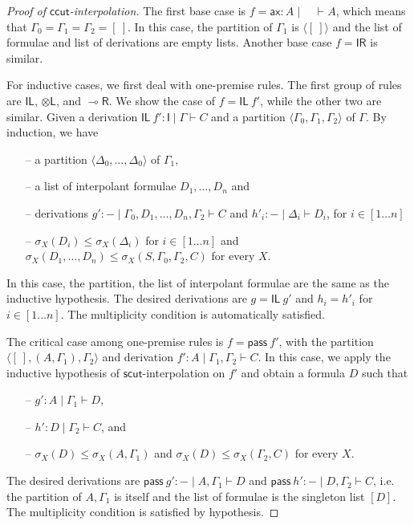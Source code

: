 \documentclass[sn-mathphys-num]{sn-jnl}%
\newcommand{\GG}{\Gamma}
\newcommand{\GD}{\Delta}
\newcommand{\vd}{\vdash}
\newcommand{\tl}{\otimes \mathsf{L}}
\newcommand{\pass}{\mathsf{pass}}
\newcommand{\unitl}{\mathsf{IL}}
\newcommand{\unitr}{\mathsf{IR}}
\newcommand{\ax}{\mathsf{ax}}
\newcommand{\lolli}{\multimap}
\newcommand{\lright}{{\lolli}\mathsf{R}}
\newcommand{\unit}{\mathsf{I}}
\newcommand{\mf}[1]{\mathsf{#1}}
\newcommand{\gs}[1]{\sigma_{X} (#1)}
\theoremstyle{thmstyleone}%
\theoremstyle{thmstyletwo}%
\theoremstyle{thmstylethree}%
\begin{document}
\begin{proof}[Proof of $\mf{ccut}$-interpolation]
The first base case is $f  = \ax : A \mid \quad \vd A$, which means that $\GG_0 = \GG_1 = \GG_2 = [\ ]$.
In this case, the partition of $\GG_1$ is $\langle [\ ] \rangle$ and the list of formulae and list of derivations are empty lists.
Another base case $f = \unitr$ is similar.

For inductive cases, we first deal with one-premise rules. 
The first group of rules are $\unitl$, $\tl$, and $\lright$. 
We show the case of $f = \unitl \ f'$, while the other two are similar.
Given a derivation $\unitl \ f' : \unit \mid \GG \vd C$ and a partition $\langle \GG_0 , \GG_1 , \GG_2\rangle$ of $\GG$.
By induction, we have 
\begin{itemize}
  \item[--] a partition $\langle \GD_0, \dots , \GD_0 \rangle$ of $\GG_1$, 
  \item[--] a list of interpolant formulae $D_1, \dots , D_n$ and
  \item[--] derivations $g' : {-} \mid \GG_0 , D_1 , \dots , D_n , \GG_2 \vd C$ and $h'_i : {-} \mid \GD_i \vd D_i$, for $i \in [1 \dots n]$
  \item[--]  $\gs{D_i} \leq \gs{\GD_i}$ for $i \in [1 \dots n]$ and $\gs{D_1, \dots, D_n} \leq \gs{S, \GG_0, \GG_2, C}$ for every $X$.
\end{itemize}
In this case, the partition, the list of interpolant formulae are the same as the inductive hypothesis.
The desired derivations are $g = \unitl \ g'$ and $h_i = h'_i$ for $i \in [1 \dots n]$.
The multiplicity condition is automatically satisfied.

The critical case among one-premise rules is $f = \pass \ f'$, with the partition $\langle [\ ], (A, \GG_1) , \GG_2 \rangle$ and derivation $f' : A \mid \GG_1 , \GG_2 \vd C$.
In this case, we apply the inductive hypothesis of $\mf{scut}$-interpolation on $f'$ and obtain a formula $D$ such that 
\begin{itemize}
  \item[--] $g': A \mid \GG_1 \vd D$,
  \item[--] $h' : D \mid \GG_2 \vd C$, and
  \item[--] $\gs{D} \leq \gs{A , \GG_1}$ and $\gs{D} \leq \gs{\GG_2 , C}$ for every $X$.
\end{itemize}
The desired derivations are $\pass \ g' : {-} \mid A , \GG_1 \vd D$ and $\pass \ h' : {-} \mid D, \GG_2 \vd C$, i.e. the partition of $A, \GG_1$ is itself and the list of formulae is the singleton list $[D]$.
The multiplicity condition is satisfied by hypothesis.


\end{proof}
\end{document}
